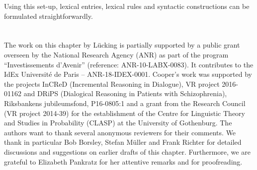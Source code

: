 \documentclass[output=paper,biblatex,babelshorthands,newtxmath,draftmode,colorlinks,citecolor=brown]{langscibook}
\begin{document}
\noindent
Using this set-up, lexical entries, lexical rules and syntactic constructions can be formulated straightforwardly.%


 
\section*{\acknowledgmentsUS}


The work on this chapter by Lücking is partially supported by a public grant overseen by the
 National Research Agency (ANR) as part of the program ``Investissements d'Avenir''
(reference: ANR-10-LABX-0083). It contributes to the IdEx Université de Paris --
ANR-18-IDEX-0001. Cooper's work was supported by the projects InCReD (Incremental Reasoning in
Dialogue), VR project 2016-01162 and DRiPS (Dialogical Reasoning in Patients with Schizophrenia),
Riksbankens jubileumsfond, P16-0805:1 and a grant from the  Research Council (VR
project 2014-39) for the establishment of the Centre for Linguistic Theory and Studies in
Probability (CLASP) at the University of Gothenburg. The authors want to thank several anonymous
reviewers for their comments. We thank in particular Bob Borsley, Stefan Müller and Frank Richter
for detailed discussions and suggestions on earlier drafts of this chapter. Furthermore, we are
grateful to Elizabeth Pankratz for her attentive remarks and for proofreading. 


{\sloppy
\printbibliography[heading=subbibliography,notkeyword=this]
}
\end{document}
